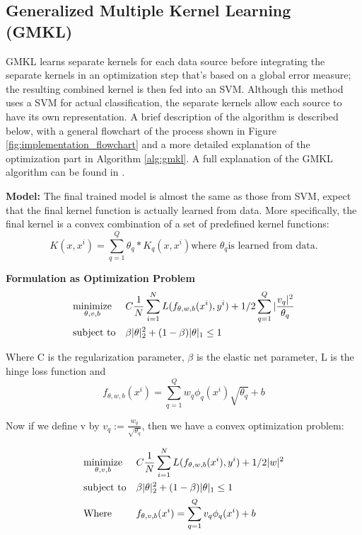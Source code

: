 \documentclass{article}
\begin{document}
\subsection*{Generalized Multiple Kernel Learning (GMKL)}
GMKL learns separate kernels for each data source before integrating the
separate kernels in an optimization step that's based on a global error
measure; the resulting combined kernel is then fed into an SVM. Although this
method uses a SVM for actual classification, the separate kernels allow each
source to have its own representation. A brief description of the algorithm is
described below, with a general flowchart of the process shown in Figure
\ref{fig:implementation_flowchart} and a more detailed explanation of the
optimization part in Algorithm \ref{alg:gmkl}. A full explanation of the GMKL
algorithm can be found in \cite{gmkl}.

\textbf{Model:}
The final trained model is almost the same as those from SVM, expect that the
final kernel function is actually learned from data. More specifically, the
final kernel is a convex combination of a set of predefined kernel functions:
$$K(x, x^i) = \sum_{q=1}^{Q} \theta_q * K_q(x, x^i) \text{where }\theta_q
\text{is learned from data}.$$

\textbf{Formulation as Optimization Problem}
\begin{align*}
&\text{$\underset{\theta, v, b}{\text{minimize}}$} & &C  \frac{1}{N} \sum_{i=1}^{N} L(f_{\theta, w, b}(x^i), y^i) + 1/2 \sum_{q=1}^{Q}|\frac{v_q|^2}{\theta_q} \\
&\text{subject to} & &\beta|\theta|_2^2 + (1-\beta){|\theta|_1} \leq 1
\end{align*}


Where C is the regularization parameter, $\beta$ is the elastic net parameter,
L is the hinge loss function and $$f_{\theta, w, b}(x^i) = \sum_{q=1}^{Q} w_q
\phi_q(x^i) \sqrt{\theta_q} + b $$

Now if we define v by $v_q := \frac{w_q}{\sqrt{\theta_q}}$, then we have a
convex optimization problem:

\begin{align*}
&\text{$\underset{\theta, v, b}{\text{minimize}}$} & &C  \frac{1}{N} \sum_{i=1}^{N} L(f_{\theta, w, b}(x^i), y^i) + 1/2 |w|^2 \\
&\text{subject to} & &\beta|\theta|_2^2 + (1-\beta){|\theta|_1} \leq 1 \\
&\text{Where}  & &f_{\theta, v, b}(x^i) = \sum_{q=1}^{Q} v_q \phi_q(x^i)  + b
\end{align*}
\end{document}
